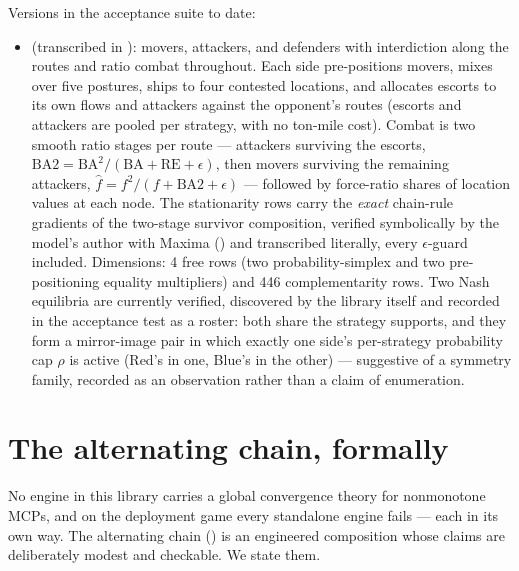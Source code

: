 Versions in the acceptance suite to date:

\begin{itemize}
\item \textbf{} (transcribed in
  ): movers, attackers, and defenders
  with interdiction along the routes and ratio combat throughout. Each side
  pre-positions movers, mixes over five postures, ships to four contested
  locations, and allocates escorts to its own flows and attackers against
  the opponent's routes (escorts and attackers are pooled per strategy,
  with no ton-mile cost). Combat is two smooth ratio stages per route ---
  attackers surviving the escorts,
  $\mathrm{BA2} = \mathrm{BA}^2/(\mathrm{BA} + \mathrm{RE} + \epsilon)$,
  then movers surviving the remaining attackers,
  $\hat f = f^2/(f + \mathrm{BA2} + \epsilon)$ --- followed by force-ratio
  shares of location values at each node. The stationarity rows carry the
  \emph{exact} chain-rule gradients of the two-stage survivor composition,
  verified symbolically by the model's author with Maxima
  \cite{maxima,macsyma} () and transcribed literally,
  every $\epsilon$-guard included. Dimensions: 4 free rows (two
  probability-simplex and two pre-positioning equality multipliers) and 446
  complementarity rows. Two Nash equilibria are currently verified,
  discovered by the library itself and recorded in the acceptance test as
  a roster: both share the strategy supports, and they form a mirror-image
  pair in which exactly one side's per-strategy probability cap $\rho$ is
  active (Red's in one, Blue's in the other) --- suggestive of a symmetry
  family, recorded as an observation rather than a claim of enumeration.
\end{itemize}

\section{The alternating chain, formally}
\label{sec:a-chain}

No engine in this library carries a global convergence theory for
nonmonotone MCPs, and on the deployment game every standalone engine fails
--- each in its own way. The alternating chain
() is an engineered composition whose claims
are deliberately modest and checkable. We state them.

